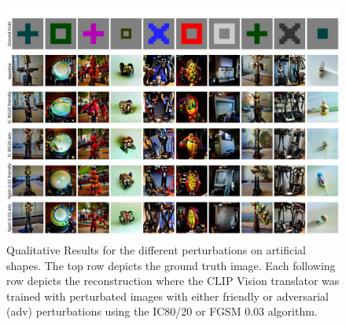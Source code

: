 \begin{figure}[H]
   \centering
   \includegraphics[width=1\textwidth]{plots/advpert_qual_art.JPEG}
   \caption[Experiment 3: Reconstructed images on artificial shapes for different perturbations]{Qualitative Results for the different perturbations on artificial shapes. The top row depicts the ground truth image. Each following row depicts the reconstruction where the CLIP Vision translator was trained with perturbated images with either friendly or adversarial (adv) perturbations using the IC80/20 or FGSM 0.03 algorithm.}\label{fig:advpert_qual_art}
\end{figure}

